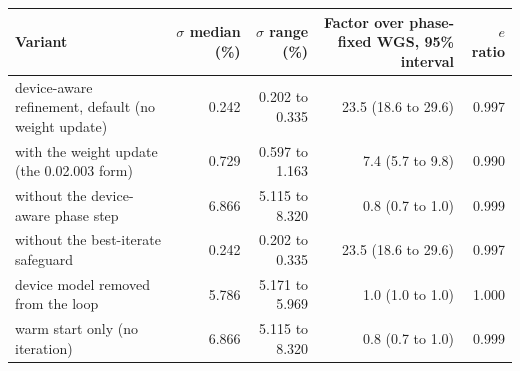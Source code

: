 \begin{tabular}{@{}l r r r r@{}}
\toprule
Variant & $\sigma$ median (\%) & $\sigma$ range (\%) & Factor over phase-fixed WGS, 95\% interval & $e$ ratio \\
\midrule
device-aware refinement, default (no weight update) & 0.242 & 0.202 to 0.335 & 23.5 (18.6 to 29.6) & 0.997 \\
with the weight update (the 0.02.003 form) & 0.729 & 0.597 to 1.163 & 7.4 (5.7 to 9.8) & 0.990 \\
without the device-aware phase step & 6.866 & 5.115 to 8.320 & 0.8 (0.7 to 1.0) & 0.999 \\
without the best-iterate safeguard & 0.242 & 0.202 to 0.335 & 23.5 (18.6 to 29.6) & 0.997 \\
device model removed from the loop & 5.786 & 5.171 to 5.969 & 1.0 (1.0 to 1.0) & 1.000 \\
warm start only (no iteration) & 6.866 & 5.115 to 8.320 & 0.8 (0.7 to 1.0) & 0.999 \\
\bottomrule
\end{tabular}
